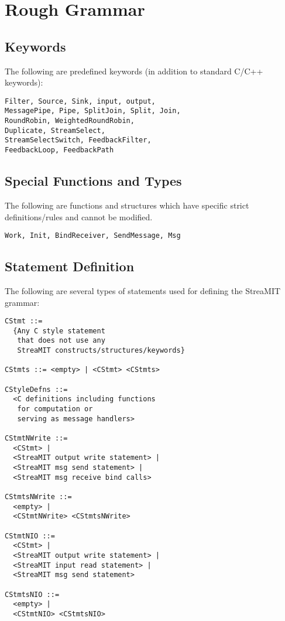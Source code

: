 \section{Rough Grammar}

\subsection{Keywords}

The following are predefined keywords (in addition to standard
C/C++ keywords):

\begin{verbatim}
Filter, Source, Sink, input, output,
MessagePipe, Pipe, SplitJoin, Split, Join,
RoundRobin, WeightedRoundRobin,
Duplicate, StreamSelect,
StreamSelectSwitch, FeedbackFilter,
FeedbackLoop, FeedbackPath
\end{verbatim}

\subsection{Special Functions and Types}

The following are functions and structures which have 
specific strict definitions/rules
and cannot be modified.

\begin{verbatim}
Work, Init, BindReceiver, SendMessage, Msg
\end{verbatim}

\subsection{Statement Definition}

The following are several types of statements used for 
defining the StreaMIT grammar:

\begin{verbatim}
CStmt ::= 
  {Any C style statement 
   that does not use any 
   StreaMIT constructs/structures/keywords}

CStmts ::= <empty> | <CStmt> <CStmts>

CStyleDefns ::=
  <C definitions including functions
   for computation or
   serving as message handlers>

CStmtNWrite ::=
  <CStmt> |
  <StreaMIT output write statement> |
  <StreaMIT msg send statement> |
  <StreaMIT msg receive bind calls>

CStmtsNWrite ::=
  <empty> |
  <CStmtNWrite> <CStmtsNWrite>

CStmtNIO ::=
  <CStmt> |
  <StreaMIT output write statement> |
  <StreaMIT input read statement> |
  <StreaMIT msg send statement>

CStmtsNIO ::=
  <empty> |
  <CStmtNIO> <CStmtsNIO>
  
\end{verbatim}

